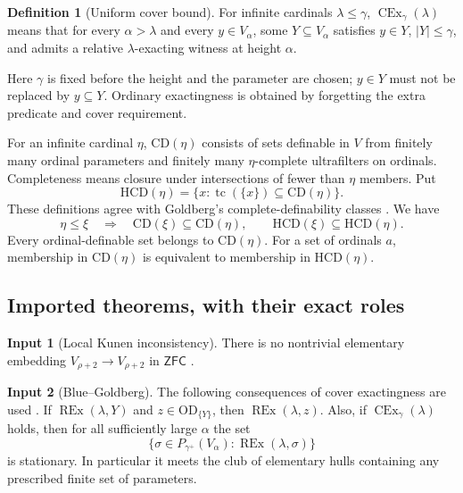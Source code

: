 \documentclass[11pt,letterpaper]{article}
\theoremstyle{definition}
\newtheorem{definition}{Definition}[section]
\newtheorem{inputthm}{Input}
\numberwithin{equation}{section}
\newcommand{\ZFC}{\mathsf{ZFC}}
\newcommand{\OD}{\mathrm{OD}}
\newcommand{\CD}{\mathrm{CD}}
\newcommand{\HCD}{\mathrm{HCD}}
\newcommand{\CEx}{\operatorname{CEx}}
\newcommand{\REx}{\operatorname{REx}}
\newcommand{\tc}{\operatorname{tc}}
\begin{document}
\begin{definition}[Uniform cover bound]
For infinite cardinals $\lambda\le\gamma$, $\CEx_\gamma(\lambda)$ means
that for every $\alpha>\lambda$ and every $y\in V_\alpha$, some
$Y\subseteq V_\alpha$ satisfies $y\in Y$, $|Y|\le\gamma$, and admits a
relative $\lambda$-exacting witness at height $\alpha$.
\end{definition}

Here $\gamma$ is fixed before the height and the parameter are chosen;
$y\in Y$ must not be replaced by $y\subseteq Y$. Ordinary exactingness
is obtained by forgetting the extra predicate and cover requirement.

For an infinite cardinal $\eta$, $\CD(\eta)$ consists of sets definable
in $V$ from finitely many ordinal parameters and finitely many
$\eta$-complete ultrafilters on ordinals. Completeness means closure
under intersections of fewer than $\eta$ members. Put
\[
\HCD(\eta)=\{x:\tc(\{x\})\subseteq\CD(\eta)\}.
\]
These definitions agree with Goldberg's complete-definability classes
\cite[\S4.1]{unique}. We have
\begin{equation}\label{eq:monotonic}
\eta\le\xi\quad\Longrightarrow\quad
\CD(\xi)\subseteq\CD(\eta),\qquad
\HCD(\xi)\subseteq\HCD(\eta).
\end{equation}
Every ordinal-definable set belongs to $\CD(\eta)$. For a set of
ordinals $a$, membership in $\CD(\eta)$ is equivalent to membership in
$\HCD(\eta)$.

\subsection{Imported theorems, with their exact roles}

\begin{inputthm}[Local Kunen inconsistency]\label{in:kunen}
There is no nontrivial elementary embedding
$V_{\rho+2}\to V_{\rho+2}$ in $\ZFC$ \cite{kunen}.
\end{inputthm}

\begin{inputthm}[Blue--Goldberg]\label{in:BG}
The following consequences of cover exactingness are used
\cite[Lemma~3.3 and Proposition~3.4]{cover}.
If $\REx(\lambda,Y)$ and $z\in\OD_{\{Y\}}$, then
$\REx(\lambda,z)$. Also, if $\CEx_\gamma(\lambda)$ holds, then for all
sufficiently large $\alpha$ the set
\[
\{\sigma\in P_{\gamma^+}(V_\alpha):\REx(\lambda,\sigma)\}
\]
is stationary. In particular it meets the club of elementary hulls
containing any prescribed finite set of parameters.
\end{inputthm}
\end{document}

